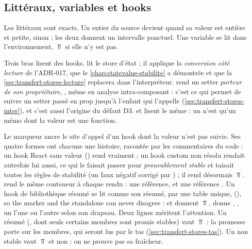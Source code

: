 \subsection{Littéraux, variables et hooks}

Les littéraux sont exacts. Un entier du source devient  quand sa
valeur est entière et petite,  sinon ; les deux donnent un
intervalle ponctuel. Une variable se lit dans l'environnement, $\Top$ si elle
n'y est pas.

Trois bras lisent des hooks.  lit le store d'état ; il
applique la \emph{conversion côté lecture} de l'ADR-017, que le
\cref{chap:statevalue-stabilite} a démontrée et que la
\cref{sec:transfert-stores-lecture} replacera dans l'interpréteur.
 rend un setter \emph{porteur de son propriétaire},
, même en analyse intra-composant : c'est
ce qui permet de suivre un setter passé en prop jusqu'à l'enfant qui
l'appelle (\cref{sec:transfert-stores-inter}), et c'est aussi l'origine du
défaut D3.  et  lisent le même
 : un  n'est qu'un mémo dont la valeur est
une fonction.

Le marqueur  ancre le site d'appel d'un hook dont la
valeur n'est pas suivie. Ses quatre formes ont chacune une histoire,
racontée par les commentaires du code : un hook React sans valeur
() rend vraiment  ; un hook custom non
résolu rendait autrefois  lui aussi, ce qui le faisait
passer pour \emph{prouvablement stable} et taisait toutes les règles de
stabilité (un faux négatif corrigé par ) ; il rend désormais
$\Top$.  rend le même conteneur à chaque rendu : une référence,
et une référence . Un hook de bibliothèque résumé se lit comme
son résumé, par une table unique, 
(), \og so the marker and
the standalone  can never disagree\fg{} :  et
 donnent $\Top$,  donne ,
 , un  l'une ou l'autre
selon son drapeau. Deux lignes méritent l'attention. Un résumé 
(, dont seuls certains membres sont promis stables) vaut
$\Top$ : la promesse porte sur les membres, qui seront lus par le tas
(\cref{sec:transfert-stores-tas}). Un  non stable vaut $\Top$
et non  : on ne prouve pas sa fraîcheur.


